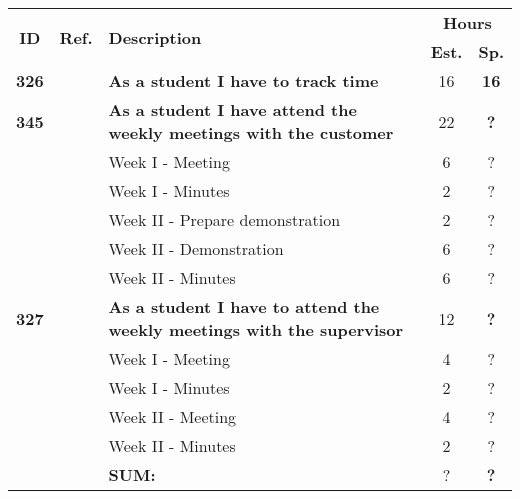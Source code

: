 \label{tab:sprint2storiesProcess}
\def\arraystretch{1.25}
 
\begin{longtable}{ccXcc}

\toprule[0.5mm]
\multirow{2}{*}{\textbf{ID}} &
\multirow{2}{*}{\textbf{Ref.}} & \multirow{2}{*}{\textbf{Description}} & \multicolumn{2}{c}{\textbf{Hours}} \\
 					& & & \textbf{Est.} & \textbf{Sp.} \\
\midrule

\textbf{326} 	&& {\bf  As a student I have to track time} 										& 	16	& \textbf{16} \\
	
\textbf{345} 	&& {\bf As a student I have attend the weekly meetings with the customer} 			& 	22	& \textbf{?} \\
		&& Week I - Meeting							&  6 & ? \\
		&& Week I - Minutes							&  2 & ? \\
		&& Week II - Prepare demonstration			&  2 & ? \\
		&& Week II - Demonstration					&  6 & ? \\
		&& Week II - Minutes						&  6 & ? \\


		
\textbf{327} 	&& {\bf As a student I have to attend the weekly meetings with the supervisor} 		& 	12	& \textbf{?} \\
		&& Week I - Meeting							&  4 & ? \\
		&& Week I - Minutes							&  2 & ? \\
		&& Week II - Meeting						&  4 & ? \\
		&& Week II - Minutes						&  2 & ? \\
				
				
\hline
				&& \textbf{SUM:}		&		?	& \textbf{?}
 \\																			
\bottomrule[0.5mm]
\end{longtable}
